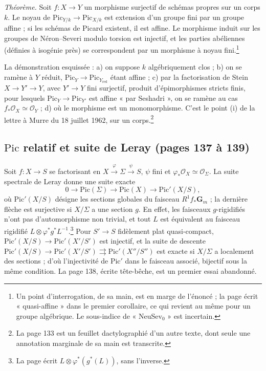 \documentclass[11pt,a4paper]{article}
\begin{document}
\emph{Théorème.} Soit $f \colon X \to Y$ un morphisme surjectif de schémas
propres sur un corps $k$. Le noyau de
$\mathrm{Pic}_{Y/k} \to \mathrm{Pic}_{X/k}$ est extension d'un groupe fini par
un groupe affine ; si les schémas de Picard existent, il est affine. Le
morphisme induit sur les groupes de Néron--Severi modulo torsion est injectif,
et les parties abéliennes (définies à isogénie près) se correspondent par un
morphisme à noyau fini.\footnote{Un point d'interrogation, de sa main, est en
marge de l'énoncé ; la page écrit « quasi-affine » dans le premier corollaire,
ce qui revient au même pour un groupe algébrique. Le sous-indice de
« NeuSev$_0$ » est incertain.}

La démonstration esquissée : a) on suppose $k$ algébriquement clos ; b) on se
ramène à $Y$ réduit, $\mathrm{Pic}_{Y} \to \mathrm{Pic}_{Y_{\mathrm{red}}}$
étant affine ; c) par la factorisation de Stein $X \to Y' \to Y$, avec
$Y' \to Y$ fini surjectif, produit d'épimorphismes stricts finis, pour lesquels
$\mathrm{Pic}_Y \to \mathrm{Pic}_{Y'}$ est affine « par Seshadri », on se
ramène au cas $f_*\mathcal{O}_X \simeq \mathcal{O}_Y$ ; d) où le morphisme est
un monomorphisme. C'est le point (i) de la lettre à Murre du 18 juillet 1962,
sur un corps.\footnote{La page 133 est un feuillet dactylographié d'un autre
texte, dont seule une annotation marginale de sa main est transcrite.}

\subsection*{$\mathrm{Pic}$ relatif et suite de Leray (pages 137 à 139)}

Soit $f \colon X \to S$ se factorisant en $X \xrightarrow{\varphi} \Sigma \xrightarrow{\psi} S$,
$\psi$ fini et $\varphi_*\mathcal{O}_X \simeq \mathcal{O}_\Sigma$. La suite
spectrale de Leray donne une suite exacte
\[
0 \to \mathrm{Pic}(\Sigma) \to \mathrm{Pic}(X) \to \mathrm{Pic}'(X/S) ,
\]
où $\mathrm{Pic}'(X/S)$ désigne les sections globales du faisceau
$R^1 f_*\mathbf{G}_m$ ; la dernière flèche est surjective si $X/\Sigma$ a une
section $g$. En effet, les faisceaux $g$-rigidifiés n'ont pas d'automorphisme
non trivial, et tout $L$ est équivalent au faisceau rigidifié
$L \otimes \varphi^*g^*L^{-1}$.\footnote{La page écrit
$L \otimes \varphi^*(g^*(L))$, sans l'inverse.} Pour $S' \to S$ fidèlement plat
quasi-compact, $\mathrm{Pic}'(X/S) \to \mathrm{Pic}'(X'/S')$ est injectif, et la
suite de descente
$\mathrm{Pic}'(X/S) \to \mathrm{Pic}'(X'/S') \rightrightarrows \mathrm{Pic}'(X''/S'')$
est exacte si $X/\Sigma$ a localement des sections ; d'où l'injectivité de
$\mathrm{Pic}'$ dans le faisceau associé, bijectif sous la même condition. La
page 138, écrite tête-bêche, est un premier essai abandonné.
\end{document}
